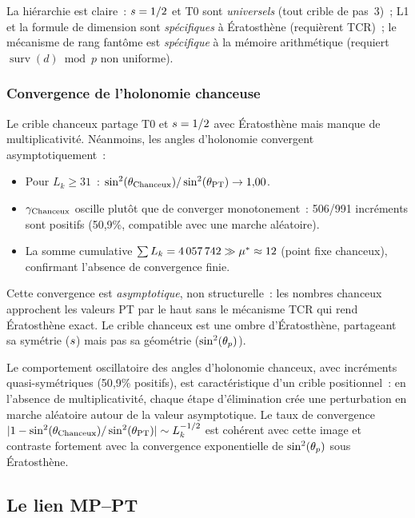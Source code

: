 \documentclass[12pt,a4paper]{article}
\begin{document}
\noindent
La hiérarchie est claire~: $s = 1/2$ et T0 sont \emph{universels}
(tout crible de pas~3)~; L1 et la formule de dimension sont
\emph{spécifiques} à Ératosthène (requièrent TCR)~; le mécanisme de
rang fantôme est \emph{spécifique} à la mémoire arithmétique
(requiert $\operatorname{surv}(d) \bmod p$ non uniforme).

\subsubsection{Convergence de l'holonomie chanceuse}
\label{sec:PM_lucky_holonomy}

Le crible chanceux partage T0 et $s = 1/2$ avec Ératosthène mais
manque de multiplicativité. Néanmoins, les angles d'holonomie
convergent asymptotiquement~:

\begin{itemize}[nosep]
\item Pour $L_k \ge 31$~:
  $\sin^2(\theta_{\mathrm{Chanceux}}) / \sin^2(\theta_{\mathrm{PT}}) \to 1{,}00$.
\item $\gamma_{\mathrm{Chanceux}}$ oscille plutôt que de converger
  monotonement~: 506/991 incréments sont positifs (50{,}9\%,
  compatible avec une marche aléatoire).
\item La somme cumulative $\sum L_k = 4\,057\,742 \gg {\mu^{*}}
  \approx 12$ (point fixe chanceux), confirmant l'absence de
  convergence finie.
\end{itemize}

Cette convergence est \emph{asymptotique}, non structurelle~: les
nombres chanceux approchent les valeurs PT par le haut sans le
mécanisme TCR qui rend Ératosthène exact. Le crible chanceux est une
ombre d'Ératosthène, partageant sa symétrie ($s$) mais pas sa
géométrie ($\sin^2(\theta_{p})$).

\begin{remarque}
Le comportement oscillatoire des angles d'holonomie chanceux, avec
incréments quasi-symétriques (50{,}9\% positifs), est
caractéristique d'un crible positionnel~: en l'absence de
multiplicativité, chaque étape d'élimination crée une perturbation
en marche aléatoire autour de la valeur asymptotique. Le taux de
convergence
$|1 - \sin^2(\theta_{\mathrm{Chanceux}}) / \sin^2(\theta_{\mathrm{PT}})| \sim L_k^{-1/2}$
est cohérent avec cette image et contraste fortement avec la
convergence exponentielle de $\sin^2(\theta_{p})$ sous Ératosthène.
\end{remarque}


\subsection{Le lien MP--PT}
\label{sec:PM_PT}
\end{document}
